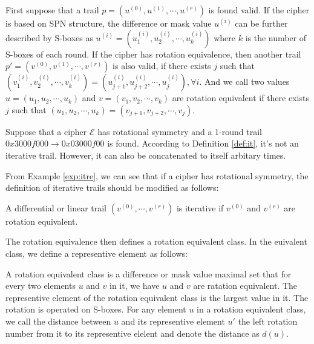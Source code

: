 \begin{definition}
	First suppose that a trail $p=(u^{(0)},u^{(1)},\cdots,u^{(r)})$ is found valid. If the cipher is based on SPN structure, the difference or mask value $u^{(i)}$ can be further described by S-boxes as $u^{(i)}=(u_1^{(i)},u_2^{(i)},\cdots,u_k^{(i)})$ where $k$ is the number of S-boxes of each round. If the cipher has rotation equivalence, then another trail $p'=(v^{(0)},v^{(1)},\cdots,v^{(r)})$ is also valid, if there exists $j$ such that $(v_1^{(i)},v_2^{(i)},\cdots,v_k^{(i)})=(u_{j+1}^{(i)},u_{j+2}^{(i)},\cdots,u_{j}^{(i)}),\forall i$. And we call two values $u=(u_1,u_2,\cdots,u_k)$ and $v=(v_1,v_2,\cdots,v_k)$ are rotation equivalent if there exists $j$ such that $(u_1,u_2,\cdots,u_k)=(v_{j+1},v_{j+2},\cdots,v_{j})$. 
\end{definition}

\begin{example}\label{exp:itre}
	Suppose that a cipher $\mathcal{E}$ has rotational symmetry and a 1-round trail $0x3000f000\rightarrow 0x03000f00$ is found. According to Definition \ref{def:it}, it's not an iterative trail. However, it can also be concatenated to itself arbitary times.
\end{example}

From Example \ref{exp:itre}, we can see that if a cipher has rotational symmetry, the definition of iterative trails should be modified as follows:  

\begin{definition}
	A differential or linear trail $(v^{(0)},\cdots,v^{(r)})$ is iterative if $v^{(0)}$ and $v^{(r)}$ are rotation equivalent.
\end{definition}

The rotation equivalence then defines a rotation equivalent class. In the euivalent class, we define a representive element as follows:

\begin{definition}
	A rotation equivalent class is a difference or mask value maximal set that for every two elements $u$ and $v$ in it, we have $u$ and $v$ are ratation equivalent. The representive element of the rotation equivalent class is the largest value in it. The rotation is operated on S-boxes. For any element $u$ in a rotation equivalent class, we call the distance between $u$ and its representive element $u'$ the left rotation number from it to its representive elelent and denote the distance as $d(u)$. 
\end{definition}

